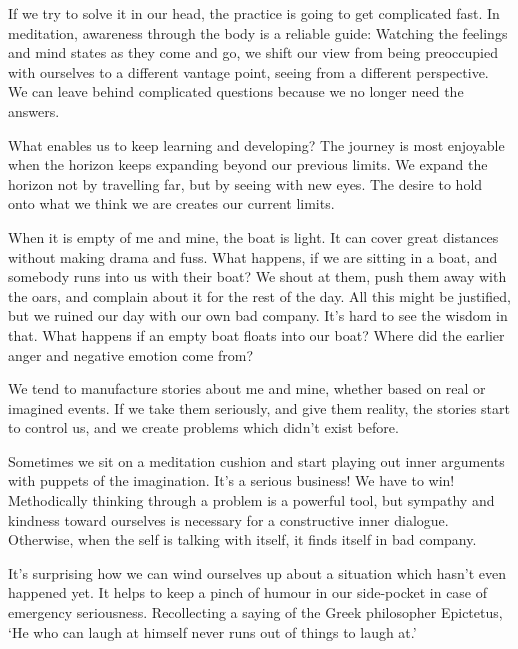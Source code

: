 If we try to solve it in our head, the practice is going to get
complicated fast. In meditation, awareness through the body is a
reliable guide: Watching the feelings and mind states as they come and
go, we shift our view from being preoccupied with ourselves to a
different vantage point, seeing from a different perspective. We can
leave behind complicated questions because we no longer need the
answers.


What enables us to keep learning and developing? The journey is most
enjoyable when the horizon keeps expanding beyond our previous limits.
We expand the horizon not by travelling far, but by seeing with new
eyes. The desire to hold onto what we think we are creates our current
limits.

When it is empty of me and mine, the boat is light. It can cover great
distances without making drama and fuss. What happens, if we are sitting
in a boat, and somebody runs into us with their boat? We shout at them,
push them away with the oars, and complain about it for the rest of the
day. All this might be justified, but we ruined our day with our own bad
company. It's hard to see the wisdom in that. What happens if an empty
boat floats into our boat? Where did the earlier anger and negative
emotion come from?

We tend to manufacture stories about me and mine, whether based on real
or imagined events. If we take them seriously, and give them reality,
the stories start to control us, and we create problems which didn't
exist before.

Sometimes we sit on a meditation cushion and start playing out inner
arguments with puppets of the imagination. It's a serious business! We
have to win! Methodically thinking through a problem is a powerful tool,
but sympathy and kindness toward ourselves is necessary for a
constructive inner dialogue. Otherwise, when the self is talking with
itself, it finds itself in bad company.


It's surprising how we can wind ourselves up about a situation which
hasn't even happened yet. It helps to keep a pinch of humour in our
side-pocket in case of emergency seriousness. Recollecting a saying of
the Greek philosopher Epictetus, `He who can laugh at himself never runs
out of things to laugh at.'


